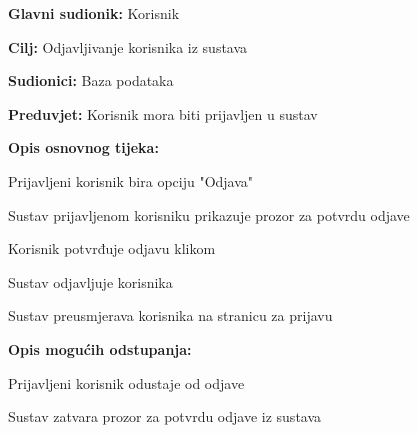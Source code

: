 					\noindent {}
					\begin{packed_item}
	
						\item \textbf{Glavni sudionik: } Korisnik
						\item  \textbf{Cilj:} Odjavljivanje korisnika iz sustava
						\item  \textbf{Sudionici:} Baza podataka
						\item  \textbf{Preduvjet:} Korisnik mora biti prijavljen u sustav
						\item  \textbf{Opis osnovnog tijeka:}
						
						\item[] \begin{packed_enum}
	
							\item Prijavljeni korisnik bira opciju "Odjava"
							\item Sustav prijavljenom korisniku prikazuje prozor za potvrdu odjave
							\item Korisnik potvrđuje odjavu klikom 
							\item Sustav odjavljuje korisnika
							\item Sustav preusmjerava korisnika na stranicu za prijavu
							
						\end{packed_enum}
						\item  \textbf{Opis mogućih odstupanja:}
						
						\item[] \begin{packed_item}
	
							\item[3.a] Prijavljeni korisnik odustaje od odjave
							\item[] \begin{packed_enum}

                                \item Sustav zatvara prozor za potvrdu odjave iz sustava
								
                
								
							\end{packed_enum}
							
						\end{packed_item}
						
					\end{packed_item}
     
